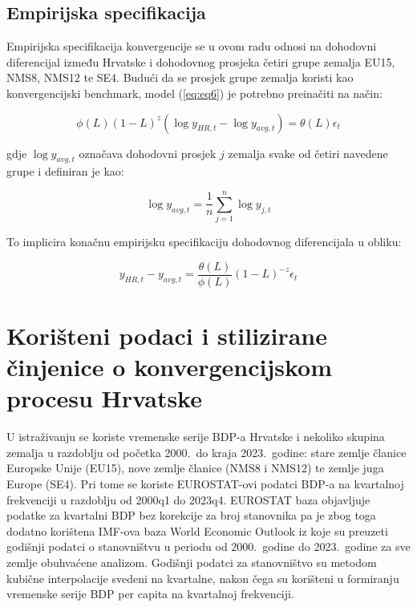 \documentclass{crebsshr}
\begin{document}
\subsection{Empirijska specifikacija}

Empirijska specifikacija konvergencije se u ovom radu odnosi na dohodovni diferencijal između Hrvatske i dohodovnog prosjeka četiri grupe zemalja EU15, NMS8, NMS12 te SE4. Budući da se prosjek grupe zemalja koristi kao konvergencijski benchmark, model (\ref{eq:eq6}) je potrebno preinačiti na način:

\begin{equation} \label{eq:eq14}
\phi(L)(1-L)^z (\log y_{HR,t} - \log y_{avg,t}) = \theta(L)\epsilon_t
\end{equation}

gdje \( \log y_{avg,t} \) označava dohodovni prosjek \( j \) zemalja svake od četiri navedene grupe i definiran je kao:

\begin{equation} \label{eq:eq15}
\log y_{avg,t} = \frac{1}{n}\sum_{j=1}^{n} \log y_{j,t}
\end{equation}

To implicira konačnu empirijsku specifikaciju dohodovnog diferencijala u obliku:

\begin{equation} \label{eq:eq16}
y_{HR,t} - y_{avg,t} = \frac{\theta(L)}{\phi(L)}(1-L)^{-z}\epsilon_t
\end{equation}


\section{Korišteni podaci i stilizirane činjenice o konvergencijskom procesu Hrvatske}

U istraživanju se koriste vremenske serije BDP-a Hrvatske i nekoliko skupina zemalja u razdoblju od početka 2000.\ do kraja 2023.\ godine: stare zemlje članice Europske Unije (EU15), nove zemlje članice (NMS8 i NMS12) te zemlje juga Europe (SE4). Pri tome se koriste EUROSTAT-ovi podatci BDP-a na kvartalnoj frekvenciji u razdoblju od 2000q1 do 2023q4. EUROSTAT baza objavljuje podatke za kvartalni BDP bez korekcije za broj stanovnika pa je zbog toga dodatno korištena IMF-ova baza World Economic Outlook iz koje su preuzeti godišnji podatci o stanovništvu u periodu od 2000.\ godine do 2023.\ godine za sve zemlje obuhvaćene analizom. Godišnji podatci za stanovništvo su metodom kubične interpolacije svedeni na kvartalne, nakon čega su korišteni u formiranju vremenske serije BDP per capita na kvartalnoj frekvenciji.
\end{document}
